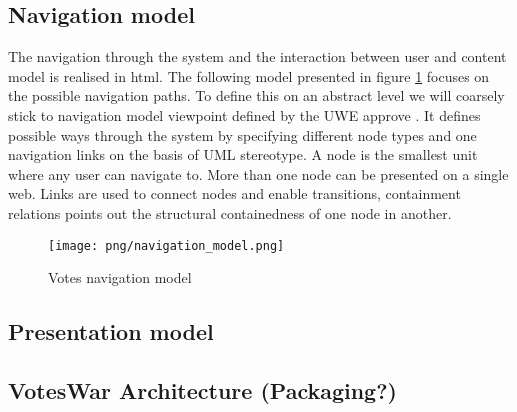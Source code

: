 \subsection{Navigation model}

The navigation through the system and the interaction between user and content model is realised in html. The following model presented in figure \ref{navigation_model} focuses on the possible navigation paths. To define this on an abstract level we will coarsely stick to navigation model viewpoint defined by the UWE approve \cite{Uwe08,uweref}. It defines possible ways through the system by specifying different node types and one navigation links on the basis of UML stereotype. A node is the smallest unit where any user can navigate to. More than one node can be presented on a single web. Links are used to connect nodes and enable transitions, containment relations points out the structural containedness of one node in another.




\begin{figure}
\label{navigation_model}
\centering
\texttt{[image: png/navigation\_model.png]}
\caption{Votes navigation model}
\end{figure}

\subsection{Presentation model}

\subsection{VotesWar Architecture (Packaging?)}
